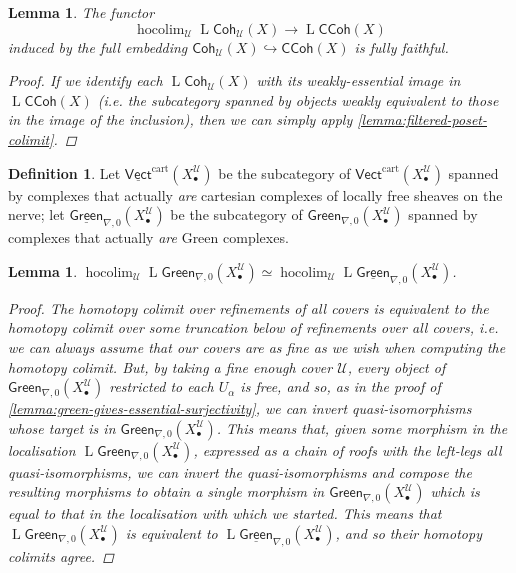 \documentclass[11pt,fleqn]{article}
\theoremstyle{plain}
\newtheorem{lemma}[theorem]{Lemma}
\theoremstyle{definition}
\newtheorem{definition}[theorem]{Definition}
\theoremstyle{remark}
\numberwithin{equation}{theorem}
\newcommand{\cover}{\mathcal{U}}
\newcommand{\gcohUX}{\mathsf{Coh}_{\cover}(X)}
\newcommand{\gccohX}{\mathsf{CCoh}(X)}
\newcommand{\cartvectX}{\mathsf{Vect}^\mathrm{cart}(X_\bullet^\cover)}
\newcommand{\greenzeroX}{\mathsf{Green}_{\nabla,0}(X_\bullet^\cover)}
\newcommand{\scartvectX}{\underline{\mathsf{Vect}}^\mathrm{cart}(X_\bullet^\cover)}
\newcommand{\sgreenzeroX}{\underline{\mathsf{Green}}_{\nabla,0}(X_\bullet^\cover)}
\DeclareMathOperator{\LL}{L}
\DeclareMathOperator{\hocolim}{hocolim}
\begin{document}
        \begin{lemma}\label{lemma:gcohUX-to-gccohX-fully-faithful}
            The functor
            \[
                \hocolim_\cover\LL{\gcohUX}\to\LL{\gccohX}
            \]
            induced by the full embedding $\gcohUX\hookrightarrow\gccohX$ is fully faithful.

            \begin{proof}
                If we identify each $\LL{\gcohUX}$ with its weakly-essential image in $\LL{\gccohX}$ (i.e. the subcategory spanned by objects \emph{weakly equivalent} to those in the image of the inclusion), then we can simply apply \cref{lemma:filtered-poset-colimit}.
            \end{proof}
        \end{lemma}

        \begin{definition}
            Let $\scartvectX$ be the subcategory of $\cartvectX$ spanned by complexes that actually \emph{are} cartesian complexes of locally free sheaves on the nerve; let $\sgreenzeroX$ be the subcategory of $\greenzeroX$ spanned by complexes that actually \emph{are} Green complexes.
        \end{definition}

        \begin{lemma}\label{lemma:can-sort-of-strictify-vect-and-green}
            $\hocolim_\cover\LL{\greenzeroX} \simeq \hocolim_\cover\LL{\sgreenzeroX}$.
            
            \begin{proof}
                The homotopy colimit over refinements of all covers is equivalent to the homotopy colimit over some truncation below of refinements over all covers, i.e. we can always assume that our covers are as fine as we wish when computing the homotopy colimit.
                But, by taking a fine enough cover $\cover$, every object of $\greenzeroX$ restricted to each $U_\alpha$ is free, and so, as in the proof of \cref{lemma:green-gives-essential-surjectivity}, we can invert quasi-isomorphisms whose target is in $\greenzeroX$.
                This means that, given some morphism in the localisation $\LL{\greenzeroX}$, expressed as a chain of roofs with the left-legs all quasi-isomorphisms, we can invert the quasi-isomorphisms and compose the resulting morphisms to obtain a single morphism in $\greenzeroX$ which is equal to that in the localisation with which we started.
                This means that $\LL{\greenzeroX}$ is equivalent to $\LL{\sgreenzeroX}$, and so their homotopy colimits agree.
            \end{proof}
        \end{lemma}
\end{document}
